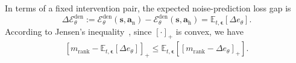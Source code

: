 \documentclass[9pt,journal]{IEEEtran}
\newcommand{\E}{\mathbb{E}}
\newcommand{\Eden}{\ensuremath{\mathcal{E}_{\theta}^{\mathrm{den}}}}
\newcommand{\va}{\bm{a}}
\newcommand{\vs}{\bm{s}}
\newcommand{\veps}{\bm{\epsilon}}
\newcommand{\vah}{\ensuremath{\va_{\mathrm h}}}      %
\newcommand{\van}{\ensuremath{\va_{\mathrm n}}}      %
\begin{document}
In terms of a fixed intervention pair, the expected noise-prediction loss gap is
\begin{equation*}
    \Delta\Eden
    :=
    \Eden(\vs,\van)
    -
    \Eden(\vs,\vah)
    =
    \E_{t,\veps}
    \left[
    \Delta e_\theta
    \right].
\end{equation*}
According to Jensen's inequality~\cite{jensen1906convex}, since $[\cdot]_+$ is convex, we have
\begin{equation}
    \begin{aligned}
        \left[
        m_{\mathrm{rank}}-\E_{t,\veps}[\Delta e_\theta]
        \right]_+
        \leq
        \E_{t,\veps}
        \left[
        \left[
        m_{\mathrm{rank}}-\Delta e_\theta
        \right]_+
        \right].
    \end{aligned}
    \label{eq:energyrank_jensen}
\end{equation}


\end{document}
